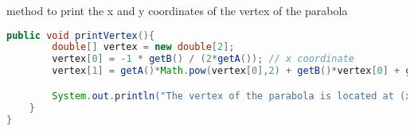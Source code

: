 \documentclass{article}
\begin{document}
 method to print the x and y coordinates of the vertex of the parabola

\begin{lstlisting}[language=Java]
    public void printVertex(){
        double[] vertex = new double[2];
        vertex[0] = -1 * getB() / (2*getA()); // x coordinate
        vertex[1] = getA()*Math.pow(vertex[0],2) + getB()*vertex[0] + getC(); // y coordinate

        System.out.println("The vertex of the parabola is located at (x,y) = " + Arrays.toString(vertex));
    }
}
\end{lstlisting}
\end{document}
